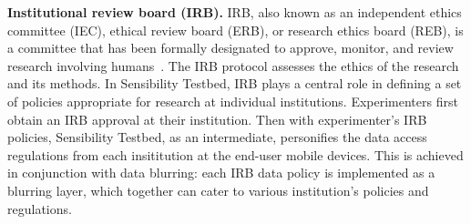 \textbf{Institutional review board (IRB).}
IRB, also known as an independent ethics committee (IEC), ethical 
review board (ERB), or research ethics board (REB), is a committee 
that has been formally designated to approve, monitor, and review 
research involving humans~\cite{irb}. The IRB protocol assesses 
the ethics of the research and its methods. 
In Sensibility Testbed, IRB plays a central role in defining a set of policies
appropriate for research at individual institutions. Experimenters
first obtain an IRB approval at their institution. Then with experimenter's IRB
policies, Sensibility Testbed, as an intermediate, personifies the data access regulations
from each insititution at the end-user mobile devices. This is achieved
in conjunction with data blurring: each IRB data policy is implemented
as a blurring layer, which together can cater to various institution's 
policies and regulations.